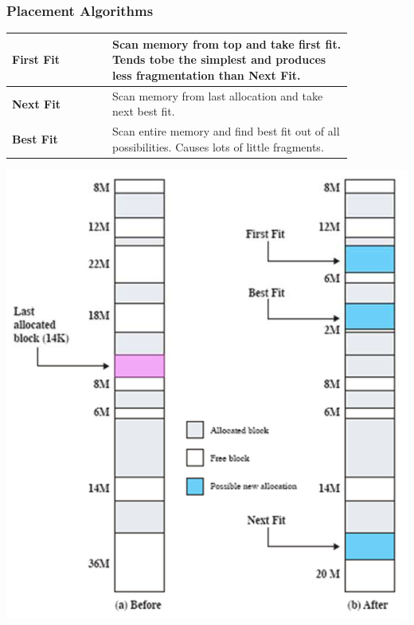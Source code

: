 		\subsubsection{Placement Algorithms}
			\begin{minipage}[t]{0.6\textwidth}		
				\begin{table}[H]
					\centering
					\begin{tabular}{|p{0.25\linewidth}|p{0.6\linewidth}|}
						\hline
						\textbf{First Fit}
							& Scan memory from top and take first fit. Tends tobe the simplest and produces less fragmentation than \textbf{Next Fit}.\\
						\hline
						\textbf{Next Fit}
							& Scan memory from last allocation and take next best fit.\\
						\hline
						\textbf{Best Fit}
							& Scan entire memory and find best fit out of all possibilities. Causes lots of little fragments.\\
						\hline	
					\end{tabular}
				\end{table}
			\end{minipage}
			\begin{minipage}[t]{0.4\textwidth}
				\vspace{0pt}
				
				\includegraphics[width=1\textwidth]{./pictures/dynamic_partitioning.png}
			\end{minipage}
			
